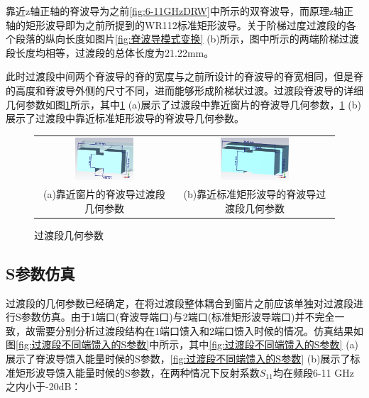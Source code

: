 \documentclass[master]{thesis-uestc}
\begin{document}
靠近z轴正轴的脊波导为之前\ref{fig:6-11GHzDRW}中所示的双脊波导，而原理z轴正轴的矩形波导即为之前所提到的WR112标准矩形波导。关于阶梯过度过渡段的各个段落的纵向长度如图片\ref{fig:脊波导模式变换} (b)所示，图中所示的两端阶梯过渡段长度均相等，过渡段的总体长度为21.22mm。

此时过渡段中间两个脊波导的脊的宽度与之前所设计的脊波导的脊宽相同，但是脊的高度和脊波导外侧的尺寸不同，进而能够形成阶梯状过渡。过渡段脊波导的详细几何参数如图\ref{fig:过渡段几何参数}所示，其中\ref{fig:过渡段几何参数} (a)展示了过渡段中靠近窗片的脊波导几何参数，\ref{fig:过渡段几何参数} (b)展示了过渡段中靠近标准矩形波导的脊波导几何参数。

\begin{figure}[!htb]
    \small
    \centering
    \begin{tabular}{@{\ }c@{\ }c}
        \includegraphics[width=0.45\textwidth]{pic/chapter3/靠近窗片的脊波导过渡段.png} & 
        \hspace{5pt}
        \includegraphics[width=0.45\textwidth]{pic/chapter3/靠近标准矩形波导的脊波导过渡段.png}     \\
        \mbox{\small (a)靠近窗片的脊波导过渡段几何参数}                                                                               & 
        \mbox{\small (b)靠近标准矩形波导的脊波导过渡段几何参数}                                                                                  \\
    \end{tabular}
    \caption{过渡段几何参数}
    \label{fig:过渡段几何参数}
\end{figure}

\subsection{S参数仿真}
过渡段的几何参数已经确定，在将过渡段整体耦合到窗片之前应该单独对过渡段进行S参数仿真。由于1端口(脊波导端口)与2端口(标准矩形波导端口)并不完全一致，故需要分别分析过渡段结构在1端口馈入和2端口馈入时候的情况。仿真结果如图\ref{fig:过渡段不同端馈入的S参数}中所示，其中\ref{fig:过渡段不同端馈入的S参数} (a)展示了脊波导馈入能量时候的S参数，\ref{fig:过渡段不同端馈入的S参数} (b)展示了标准矩形波导馈入能量时候的S参数，在两种情况下反射系数$S_{11}$均在频段6-11 GHz之内小于-20dB：
\end{document}
